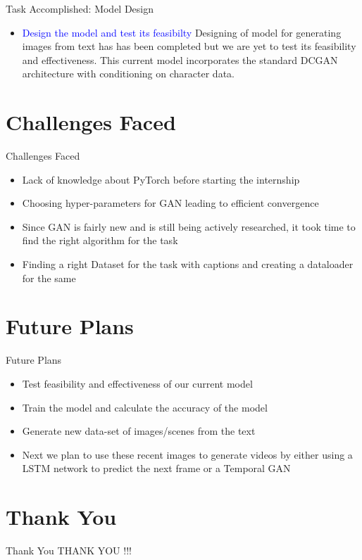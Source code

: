 \documentclass[10pt, a4paper]{beamer}
\begin{document}
\begin{frame}{Task Accomplished: Model Design}
    \begin{itemize}
        \item 
        {\textcolor{blue}{Design the model and test its feasibilty}}
        \linebreak\linebreak
        Designing of model for generating images from text has has been completed but we are yet to test its feasibility and effectiveness. This current model incorporates the standard DCGAN architecture with conditioning on character data.
    \end{itemize}
\end{frame}




\section{Challenges Faced}
\begin{frame}{Challenges Faced}
	\begin{itemize}

		\item Lack of knowledge about PyTorch before starting the internship
		\item Choosing hyper-parameters for GAN leading to efficient convergence
		\item Since GAN is fairly new and is still being actively researched, it took time to find the right algorithm for the task
		\item Finding a right Dataset for the task with captions and creating a dataloader for the same
	\end{itemize}
\end{frame}

\section{Future Plans}
\begin{frame}{Future Plans}
	\begin{itemize}
		\item Test feasibility and effectiveness of our current model
		\item Train the model and calculate the accuracy of the model
		\item Generate new data-set of images/scenes from the text
		\item Next we plan to use these recent images to generate videos by either using a LSTM network to predict the next frame or a Temporal GAN


	\end{itemize}
\end{frame}


\section{Thank You}
\begin{frame}{Thank You}
	\centering THANK YOU !!!
\end{frame}
\end{document}
